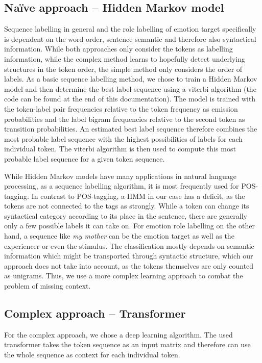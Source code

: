 \documentclass[12pt,pdftex,a4paper]{scrartcl}
\begin{document}
\subsection{Na\"{i}ve approach -- Hidden Markov model}
Sequence labelling in general and the role labelling of emotion target specifically is dependent on the word order, sentence semantic and therefore also syntactical information. While both approaches only consider the tokens as labelling information, while the complex method learns to hopefully detect underlying structures in the token order, the simple method only considers the order of labels. As a basic sequence labelling method, we chose to train a Hidden Markov model and then determine the best label sequence using a viterbi algorithm (the code can be found at the end of this documentation). The model is trained with the token-label pair frequencies relative to the token frequency as emission probabilities and the label bigram frequencies relative to the second token as transition probabilities. An estimated best label sequence therefore combines the most probable label sequence with the highest possibilities of labels for each individual token. The viterbi algorithm is then used to compute this most probable label sequence for a given token sequence. 

While Hidden Markov models have many applications in natural language processing, as a sequence labelling algorithm, it is most frequently used for POS-tagging. In contrast to POS-tagging, a HMM in our case has a deficit, as the tokens are not connected to the tags as strongly. While a token can change its syntactical category according to its place in the sentence, there are generally only a few possible labels it can take on. For emotion role labelling on the other hand, a sequence like \textit{my mother} can be the emotion target as well as the experiencer or even the stimulus. The classification mostly depends on semantic information which might be transported through syntactic structure, which our approach does not take into account, as the tokens themselves are only counted as unigrams. Thus, we use a more complex learning approach to combat the problem of missing context. 

\subsection{Complex approach -- Transformer}
For the complex approach, we chose a deep learning algorithm. The used transformer takes the token sequence as an input matrix and therefore can use the whole sequence as context for each individual token. 
\end{document}
